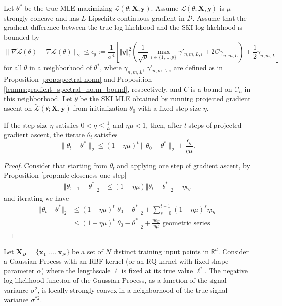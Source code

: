 \begin{theorem}\label{thm:mle-closeness-gradient-ascent}
Let $\theta^*$ be the true MLE maximizing $\mathcal{L}(\theta; \mathbf{X}, \mathbf{y})$. Assume $\mathcal{L}(\theta; \mathbf{X}, \mathbf{y})$ is $\mu$-strongly concave and has $L$-Lipschitz continuous gradient in $\mathcal{D}$. Assume that the gradient difference between the true log-likelihood and the SKI log-likelihood is bounded by
$$
\| \nabla \tilde{\mathcal{L}}(\theta) - \nabla \mathcal{L}(\theta) \|_2 \leq \epsilon_g := \frac{1}{\sigma^4}\left[\Vert y\Vert_1^2\left(\frac{1}{\sqrt{p}}\max_{i \in \{1,\ldots,p\}} \gamma'_{n,m,L,i}+2 C\gamma_{n,m,L}\right)+\frac{1}{2}\gamma_{n,m,L}\right]
$$
for all $\theta$ in a neighborhood of $\theta^*$, where $\gamma_{n,m,L}$, $\gamma'_{n,m,L,i}$ are defined as in Proposition \ref{prop:spectral-norm} and Proposition \ref{lemma:gradient_spectral_norm_bound}, respectively, and $C$ is a bound on $C_n$ in this neighborhood. Let $\tilde{\theta}$ be the SKI MLE obtained by running projected gradient ascent on $\tilde{\mathcal{L}}(\theta; \mathbf{X}, \mathbf{y})$ from initialization $\theta_0$ with a fixed step size $\eta$.

If the step size $\eta$ satisfies $0 < \eta \leq \frac{1}{L}$ and $\eta \mu < 1$, then, after $t$ steps of projected gradient ascent, the iterate $\theta_t$ satisfies
$$
\| \theta_t - \theta^* \|_2 \leq (1 - \eta\mu)^t \| \theta_0 - \theta^* \|_2 + \frac{\epsilon_g}{\eta\mu}.
$$
\end{theorem}
\begin{proof}
    Consider that starting from $\theta_t$ and applying one step of gradient ascent, by Proposition \ref{prop:mle-closeness-one-step}
    \begin{align*}
        \Vert \theta_{t+1}-\theta^*\Vert_2 &\leq (1-\eta\mu)\Vert \theta_t-\theta^*\Vert_2+\eta \epsilon_g
    \end{align*}
    and iterating we have
    \begin{align*}
        \Vert \theta_t-\theta^*\Vert_2&\leq (1-\eta\mu)^t\Vert \theta_0-\theta^*\Vert_2+\sum_{s=0}^{t-1} (1-\eta\mu)^s \eta \epsilon_g\\
        &\leq (1-\eta\mu)^t\Vert \theta_0-\theta^*\Vert_2+\frac{\eta\epsilon_G}{\eta\mu}\text{ geometric series}
    \end{align*}
\end{proof}
\begin{lemma}
Let $\mathbf{X}_D = \{\mathbf{x}_1, \ldots, \mathbf{x}_N\}$ be a set of $N$ distinct training input points in $\mathbb{R}^d$. Consider a Gaussian Process with an RBF kernel (or an RQ kernel with fixed shape parameter $\alpha$) where the lengthscale $\ell$ is fixed at its true value $\ell^*$. The negative log-likelihood function of the Gaussian Process, as a function of the signal variance $\sigma^2$, is locally strongly convex in a neighborhood of the true signal variance $\sigma^{*2}$.
\end{lemma}

